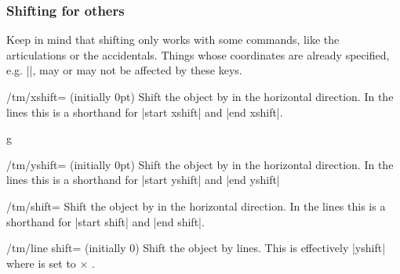 \subsubsection{Shifting for others}\label{sec:custom:transformations:others}
Keep in mind that shifting only works with some commands, like the articulations 
or the accidentals. Things whose coordinates are already specified, e.g. 
|\tmwhole|, may or may not be affected by these keys.
\begin{key}{/tm/xshift= (initially 0pt)}
  Shift the object by  in the horizontal direction. In the lines 
  this is a shorthand for |start xshift| and |end xshift|.
\end{key}
\begin{codeexample}[]
\begin{tmline}
\begin{tmstaff}{g}{}
\end{tmstaff}
\end{tmline}
\end{codeexample}
\begin{key}{/tm/yshift= (initially 0pt)}
  Shift the object by  in the horizontal direction. In the lines 
  this is a shorthand for |start yshift| and |end yshift|
\end{key}
\begin{key}{/tm/shift=}
  Shift the object by  in the horizontal direction. In the lines 
  this is a shorthand for |start shift| and |end shift|.
\end{key}
\begin{key}{/tm/line shift= (initially 0)}
  Shift the object by  lines. This is effectively |yshift| where 
   is set to  $\times$ .
\end{key}
\begin{codeexample}[]
\begin{tmline}
\begin{tmstaff*}{}
   
\end{tmstaff*}
\end{tmline}
\end{codeexample}
